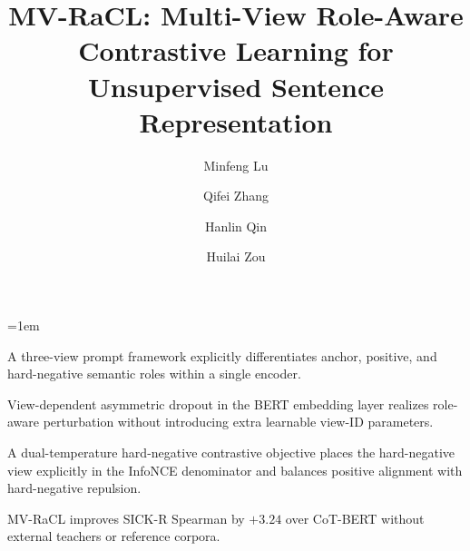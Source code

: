\documentclass[a4paper,fleqn]{cas-dc}
\begin{document}
\let\WriteBookmarks\relax
\def\floatpagepagefraction{1}
\def\textpagefraction{.001}
\emergencystretch=1em

\title[mode=title]{MV-RaCL: Multi-View Role-Aware Contrastive Learning for Unsupervised Sentence Representation}

\author[1]{Minfeng Lu}
\credit{}

\author[2]{Qifei Zhang}
\credit{}

\author[1]{Hanlin Qin}
\credit{}

\author[1]{Huilai Zou}
\cormark[1]
\credit{}




\graphicspath{{figures/}}


\begin{highlights}
\item A three-view prompt framework explicitly differentiates anchor, positive, and hard-negative semantic roles within a single encoder.
\item View-dependent asymmetric dropout in the BERT embedding layer realizes role-aware perturbation without introducing extra learnable view-ID parameters.
\item A dual-temperature hard-negative contrastive objective places the hard-negative view explicitly in the InfoNCE denominator and balances positive alignment with hard-negative repulsion.
\item MV-RaCL improves SICK-R Spearman by $+3.24$ over CoT-BERT without external teachers or reference corpora.
\end{highlights}
\end{document}
